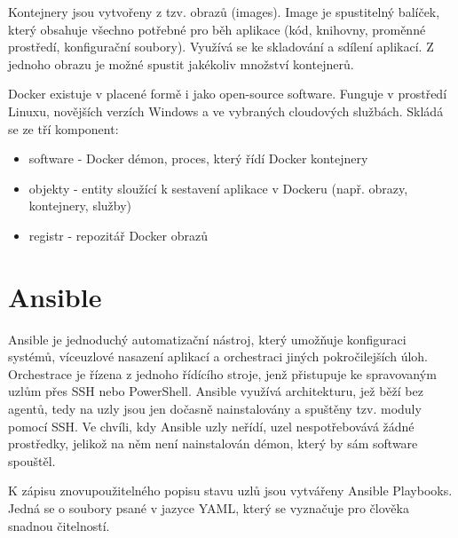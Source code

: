 Kontejnery jsou vytvořeny z tzv. obrazů (images). Image je spustitelný balíček, který obsahuje všechno potřebné pro běh aplikace (kód, knihovny, proměnné prostředí, konfigurační soubory). Využívá se ke skladování a sdílení aplikací. Z jednoho obrazu je možné spustit jakékoliv množství kontejnerů. 

Docker existuje v placené formě i jako open-source software. Funguje v prostředí Linuxu, novějších verzích Windows a ve vybraných cloudových službách. Skládá se ze tří komponent:

\begin{itemize}
\item software - Docker démon, proces, který řídí Docker kontejnery
\item objekty - entity sloužící k sestavení aplikace v Dockeru (např. obrazy, kontejnery, služby)
\item registr - repozitář Docker obrazů
\end{itemize}

\section{Ansible}
\label{ansible}  

Ansible je jednoduchý automatizační nástroj, který umožňuje konfiguraci systémů, víceuzlové nasazení aplikací a orchestraci jiných pokročilejších úloh. Orchestrace je řízena z jednoho řídícího stroje, jenž přistupuje ke spravovaným uzlům přes SSH nebo PowerShell. Ansible využívá architekturu, jež běží bez agentů, tedy na uzly jsou jen dočasně nainstalovány a spuštěny tzv. moduly pomocí SSH. Ve chvíli, kdy Ansible uzly neřídí, uzel nespotřebovává žádné prostředky, jelikož na něm není nainstalován démon, který by sám software spouštěl.

K zápisu znovupoužitelného popisu stavu uzlů jsou vytvářeny Ansible Playbooks. Jedná se o soubory psané v jazyce YAML, který se vyznačuje pro člověka snadnou čitelností.